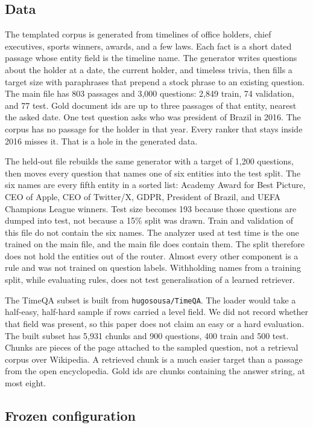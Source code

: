 \documentclass[11pt]{article}
\begin{document}
\subsection{Data}

The templated corpus is generated from timelines of office holders, chief executives, sports winners, awards, and a few laws.
Each fact is a short dated passage whose entity field is the timeline name.
The generator writes questions about the holder at a date, the current holder, and timeless trivia, then fills a target size with paraphrases that prepend a stock phrase to an existing question.
The main file has 803 passages and 3{,}000 questions: 2{,}849 train, 74 validation, and 77 test.
Gold document ids are up to three passages of that entity, nearest the asked date.
One test question asks who was president of Brazil in 2016.
The corpus has no passage for the holder in that year.
Every ranker that stays inside 2016 misses it.
That is a hole in the generated data.

The held-out file rebuilds the same generator with a target of 1{,}200 questions, then moves every question that names one of six entities into the test split.
The six names are every fifth entity in a sorted list: Academy Award for Best Picture, CEO of Apple, CEO of Twitter/X, GDPR, President of Brazil, and UEFA Champions League winners.
Test size becomes 193 because those questions are dumped into test, not because a 15\% split was drawn.
Train and validation of this file do not contain the six names.
The analyzer used at test time is the one trained on the main file, and the main file does contain them.
The split therefore does not hold the entities out of the router.
Almost every other component is a rule and was not trained on question labels.
Withholding names from a training split, while evaluating rules, does not test generalisation of a learned retriever.

The TimeQA subset is built from \texttt{hugosousa/TimeQA}.
The loader would take a half-easy, half-hard sample if rows carried a level field.
We did not record whether that field was present, so this paper does not claim an easy or a hard evaluation.
The built subset has 5{,}931 chunks and 900 questions, 400 train and 500 test.
Chunks are pieces of the page attached to the sampled question, not a retrieval corpus over Wikipedia.
A retrieved chunk is a much easier target than a passage from the open encyclopedia.
Gold ids are chunks containing the answer string, at most eight.

\subsection{Frozen configuration}
\end{document}
